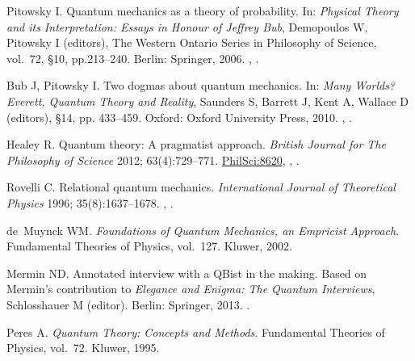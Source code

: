 \documentclass[DIV=calc,fontsize=12pt]{scrartcl} %
\theoremstyle{definition}
\theoremstyle{plain}
\begin{document}
\begin{thebibliography}{999}
Pitowsky I.
\newblock Quantum mechanics as a theory of probability.
\newblock In: \emph{Physical Theory and
its Interpretation: Essays in Honour of Jeffrey Bub}, Demopoulos W, Pitowsky I (editors), The
Western Ontario Series in Philosophy of Science, vol.~72, \S 10, pp.213--240.
Berlin: Springer, 2006.
\newblock \href {http://arxiv.org/abs/quant-ph/0510095}{},
\newblock \href {http://dx.doi.org/10.1007/1-4020-4876-9_10}{}.

Bub J, Pitowsky I.
\newblock Two dogmas about quantum mechanics.
\newblock In: {\em
{Many Worlds? Everett, Quantum Theory and Reality}}, Saunders S, Barrett J, Kent A, Wallace D (editors), \S 14, pp.
433--459. Oxford: Oxford University Press, 2010.
\newblock \href {http://arxiv.org/abs/0712.4258} {},
\href {http://dx.doi.org/10.1093/acprof:oso/9780199560561.003.0016}
{}.

Healey R.
\newblock Quantum theory: A pragmatist approach.
\newblock \emph{British Journal for The Philosophy of Science} 2012; 63(4):729--771.
\newblock \href{http://philsci-archive.pitt.edu/8620/}{PhilSci:8620},
\newblock \href {http://arxiv.org/abs/1008.3896} {},
\href {http://dx.doi.org/10.1093/bjps/axr054}
{}.

Rovelli C.
\newblock Relational quantum mechanics.
\newblock \emph{International Journal of Theoretical Physics} 1996; 35(8):1637--1678.
\newblock \href {http://arxiv.org/abs/quant-ph/9609002}
{}, \href {http://dx.doi.org/10.1007/BF02302261}
{}.

de~Muynck WM.
\newblock \emph{Foundations of Quantum Mechanics, an Empricist Approach}. Fundamental Theories of Physics, vol.~127.
\newblock Kluwer, 2002.

Mermin ND.
\newblock Annotated interview with a QBist in the making.
\newblock Based on Mermin's contribution to
\emph{Elegance and Enigma: The Quantum Interviews}, Schlosshauer M (editor). Berlin: Springer, 2013.
\newblock \href {http://arxiv.org/abs/1301.6551} {}.

Peres A.
\newblock \emph{Quantum Theory: Concepts and Methods}. Fundamental Theories of Physics, vol.~72.
\newblock Kluwer, 1995.


\end{thebibliography}
\end{document}

